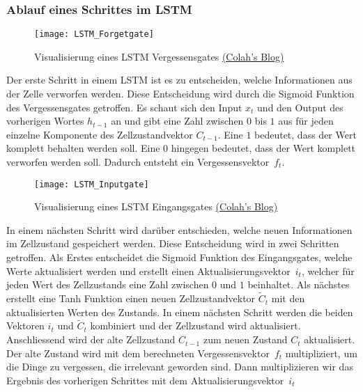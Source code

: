 \subsubsection{Ablauf eines Schrittes im LSTM}
\label{sub:lstm-step-by-step}
\begin{figure}[H]
	\centering
	\texttt{[image: LSTM\_Forgetgate]}
	\caption{Visualisierung eines LSTM Vergessensgates \href{http://colah.github.io/posts/2015-08-Understanding-LSTMs}{(Colah's Blog)}}
	\label{fig:LSTM-Forgetgate}
\end{figure}
\noindent
Der erste Schritt in einem \gls{LSTM} ist es zu entscheiden, welche Informationen aus der Zelle verworfen werden. Diese
Entscheidung wird durch die Sigmoid Funktion des Vergessensgates getroffen. Es schaut sich den Input $x_t$ und den
Output des vorherigen Wortes $h_{t-1}$ an und gibt eine Zahl zwischen $0$ bis $1$ aus für jeden einzelne Komponente des
Zellzustandvektor $C_{t-1}$. Eine $1$ bedeutet, dass der Wert komplett behalten werden soll. Eine $0$ hingegen bedeutet,
dass der Wert komplett verworfen werden soll. Dadurch entsteht ein \flqq Vergessensvektor\frqq \ $f_t$.
\newline
\begin{figure}[H]
	\centering
	\texttt{[image: LSTM\_Inputgate]}
	\caption{Visualisierung eines LSTM Eingangsgates \href{http://colah.github.io/posts/2015-08-Understanding-LSTMs}{(Colah's Blog)}}
	\label{fig:LSTM-Inputgate}
\end{figure}
\noindent
In einem nächsten Schritt wird darüber entschieden, welche neuen Informationen im Zellzustand gespeichert werden. Diese
Entscheidung wird in zwei Schritten getroffen. Als Erstes entscheidet die Sigmoid Funktion des Eingangsgates, welche
Werte aktualisiert werden und erstellt einen \flqq Aktualisierungsvektor\frqq \ $i_t$, welcher für jeden Wert des
Zellzustands eine Zahl zwischen $0$ und $1$ beinhaltet. Als nächstes erstellt eine Tanh Funktion einen neuen
Zellzustandvektor $\tilde{C}_t$ mit den aktualisierten Werten des Zustands. In einem nächsten Schritt werden die beiden
Vektoren $i_t$ und $\tilde{C}_t$ kombiniert und der Zellzustand wird aktualisiert.
\newline
\newline
Anschliessend wird der alte Zellzustand $C_{t-1}$ zum neuen Zustand $C_t$ aktualisiert. Der alte Zustand wird mit dem
berechneten \flqq Vergessensvektor\frqq \ $f_t$ multipliziert, um die Dinge zu vergessen, die irrelevant geworden sind.
Dann multiplizieren wir das Ergebnis des vorherigen Schrittes mit dem \flqq Aktualisierungsvektor\frqq \ $i_t$
